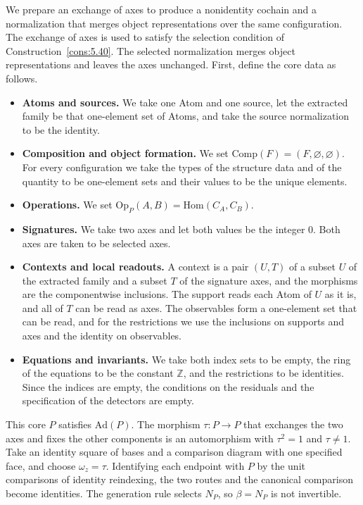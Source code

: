 \begin{example}\label{ex:6.18}

We prepare an exchange of axes to produce a nonidentity cochain and a normalization
that merges object representations over the same configuration.
The exchange of axes is used to satisfy the selection condition of Construction~\ref{cons:5.40}.
The selected normalization merges object representations and leaves the axes unchanged.
First, define the core data as follows.

\begin{itemize}
\item \textbf{Atoms and sources.} We take one Atom and one source, let the extracted family
be that one-element set of Atoms, and take the source normalization to be the identity.
\item \textbf{Composition and object formation.} We set
$\mathrm{Comp}(F)=(F,\varnothing,\varnothing)$.
For every configuration we take the types of the structure data and of the quantity to be
one-element sets and their values to be the unique elements.
\item \textbf{Operations.} We set $\mathrm{Op}_P(A,B)=\mathrm{Hom}(C_A,C_B)$.
\item \textbf{Signatures.} We take two axes and let both values be the integer 0. Both axes
are taken to be selected axes.
\item \textbf{Contexts and local readouts.} A context is a pair $(U,T)$ of a subset $U$ of
the extracted family and a subset $T$ of the signature axes, and the morphisms are the
componentwise inclusions. The support reads each Atom of $U$ as it is, and all of $T$ can
be read as axes.
The observables form a one-element set that can be read, and for the restrictions we use
the inclusions on supports and axes and the identity on observables.
\item \textbf{Equations and invariants.} We take both index sets to be empty, the ring of
the equations to be the constant $\mathbb{Z}$, and the restrictions to be identities.
Since the indices are empty, the conditions on the residuals and the specification of the
detectors are empty.
\end{itemize}

This core $P$ satisfies $\mathrm{Ad}(P)$.
The morphism $\tau:P\to P$ that exchanges the two axes and fixes the other
components is an automorphism with $\tau^2=1$ and $\tau\ne1$.
Take an identity square of bases and a comparison diagram with one specified face,
and choose $\omega_z=\tau$.
Identifying each endpoint with $P$ by the unit comparisons of identity reindexing,
the two routes and the canonical comparison become identities.
The generation rule selects $N_P$, so $\beta=N_P$ is not invertible.


\end{example}
